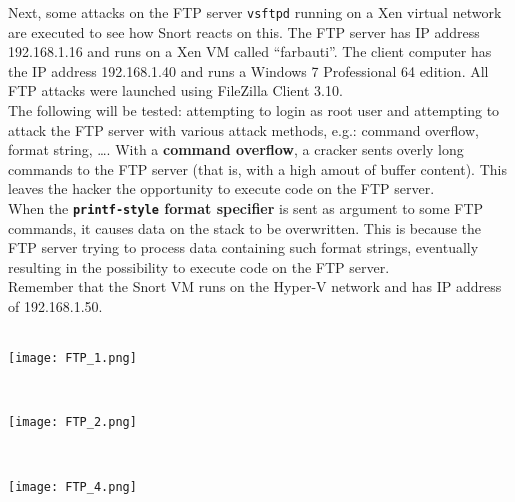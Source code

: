 Next, some attacks on the FTP server \texttt{vsftpd} running on a Xen virtual network are executed to see how Snort reacts on this. The FTP server has IP address 192.168.1.16 and runs on a Xen VM called ``farbauti''. The client computer has the IP address 192.168.1.40 and runs a Windows 7 Professional 64 edition. All FTP attacks were launched using FileZilla Client 3.10. \\
The following will be tested: attempting to login as root user and attempting to attack the FTP server with various attack methods, e.g.: command overflow, format string, \ldots. With a \textbf{command overflow}, a cracker sents overly long commands to the FTP server (that is, with a high amout of buffer content). This leaves the hacker the opportunity to execute code on the FTP server. \\
When the \textbf{\texttt{printf-style} format specifier} is sent as argument to some FTP commands, it causes data on the stack to be overwritten. This is because the FTP server trying to process data containing such format strings, eventually resulting in the possibility to execute code on the FTP server. \\
Remember that the Snort VM runs on the Hyper-V network and has IP address of 192.168.1.50. \\ \\
\noindent\begin{minipage}{\textwidth}
    \centering
    \texttt{[image: FTP\_1.png]}
\end{minipage}
$\;$ \\ \\
\noindent\begin{minipage}{\textwidth}
    \centering
    \texttt{[image: FTP\_2.png]}
\end{minipage}
$\;$ \\ \\
\noindent\begin{minipage}{\textwidth}
    \centering
    \texttt{[image: FTP\_4.png]}
\end{minipage}
$\;$ \\ \\
